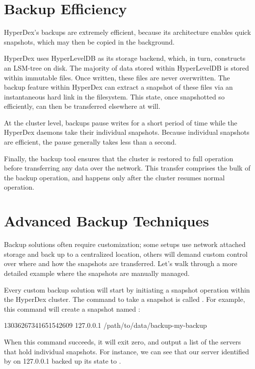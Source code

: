 \section{Backup Efficiency}

HyperDex's backups are extremely efficient, because its architecture enables
quick snapshots, which may then be copied in the background.

HyperDex uses HyperLevelDB as its storage backend, which, in turn, constructs an
LSM-tree on disk.  The majority of data stored within HyperLevelDB is stored
within immutable  files.  Once written, these files are never
overwritten.  The backup feature within HyperDex can extract a snapshot of these
files via an instantaneous hard link in the filesystem. This state, once
snapshotted so efficiently, can then be transferred elsewhere at will. 

At the cluster level, backups pause writes for a short period of time while the
HyperDex daemons take their individual snapshots.  Because individual snapshots
are efficient, the pause generally takes less than a second.

Finally, the backup tool ensures that the cluster is restored to full operation
before transferring any data over the network.  This transfer comprises the bulk
of the backup operation, and happens only after the cluster resumes normal
operation.

\section{Advanced Backup Techniques}

Backup solutions often require customization; some setups use network attached
storage and back up to a centralized location, others will demand custom control
over where and how the snapshots are transferred.  Let's walk through a more
detailed example where the snapshots are manually managed.

Every custom backup solution will start by initiating a snapshot operation
within the HyperDex cluster.  The command to take a snapshot is called
.  For example, this command will create a snapshot named
:

\begin{consolecode}
13036267341651542609 127.0.0.1 /path/to/data/backup-my-backup
\end{consolecode}

When this command succeeds, it will exit zero, and output a list of the servers
that hold individual snapshots.  For instance, we can see that our server
identified by  on 127.0.0.1 backed up its state to
.

